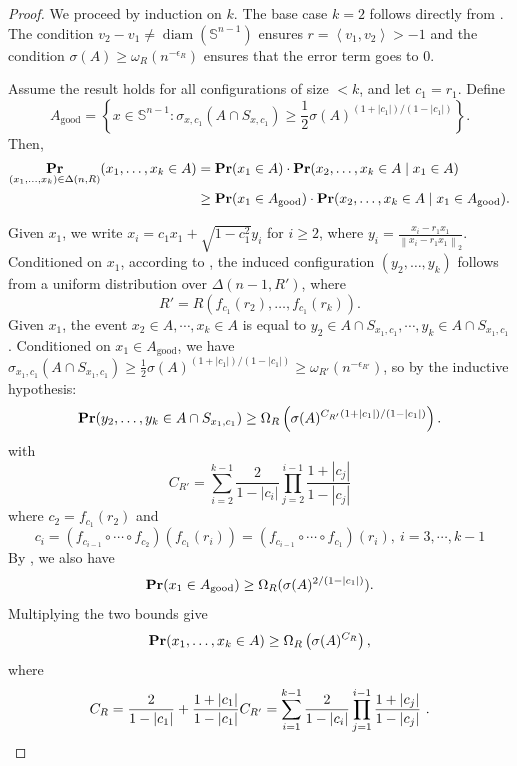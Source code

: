\documentclass[11pt]{article}
\newcommand{\inner}[1]{\left\langle{#1}\right\rangle}
\newcommand{\norm}[1]{\left\lVert#1\right\rVert}
\renewcommand{\Pr}{\mathop{\bf Pr\/}}
\newcommand{\sn}{{\mathbb{S}^{n-1} }}
\begin{document}
\begin{proof}
We proceed by induction on \( k \). The base case \( k = 2 \) follows directly from . The condition \( v_2 - v_1 \neq \operatorname{diam}(\sn) \) ensures \( r = \inner{v_1, v_2} > -1 \) and the condition $\sigma(A)\geq \omega_R(n^{-\epsilon_R})$ ensures that the error term goes to $0$.

Assume the result holds for all configurations of size \( < k \), and let \( c_1 = r_1 \). Define
\[
A_{\mathrm{good}} = \left\{x \in \sn : \sigma_{x, c_1}(A \cap S_{x, c_1}) \geq \frac{1}{2} \sigma(A)^{(1 + |c_1|)/(1 - |c_1|)} \right\}.
\]
Then,
\begin{align*}
\Pr_{(x_1, \dots, x_k) \in \Delta(n, R)}(x_1, \dots, x_k \in A)
&= \Pr(x_1 \in A) \cdot \Pr(x_2, \dots, x_k \in A \mid x_1 \in A) \\
&\geq \Pr(x_1 \in A_{\mathrm{good}}) \cdot \Pr(x_2, \dots, x_k \in A \mid x_1 \in A_{\mathrm{good}}).
\end{align*}

Given \( x_1 \), we write \( x_i = c_1 x_1 + \sqrt{1 - c_1^2} y_i \) for \( i \geq 2 \), where \( y_i =\frac{x_i-r_1x_1}{\norm{x_i-r_1x_1}_2} \). Conditioned on $x_1$, according to , the induced configuration \( (y_2, \dots, y_k) \)  follows from a uniform distribution over \( \Delta(n - 1, R') \), where
\[
R' = R(f_{c_1}(r_2), \dots, f_{c_1}(r_k)).
\]
Given $x_1$, the event $x_2\in A,\cdots,x_k\in A$ is equal to $y_2\in A\cap S_{x_1,c_1},\cdots ,y_k\in A\cap S_{x_1,c_1}$. Conditioned on \( x_1 \in A_{\mathrm{good}} \), we have \( \sigma_{x_1, c_1}(A \cap S_{x_1, c_1}) \geq \frac{1}{2} \sigma(A)^{(1 + |c_1|)/(1 - |c_1|)}\geq \omega_{R'}(n^{-\epsilon_{R'}})\), so by the inductive hypothesis:
\[
\Pr(y_2, \dots, y_k \in A \cap S_{x_1, c_1}) \geq \Omega_R\left(\sigma(A)^{C_{R'} (1 + |c_1|)/(1 - |c_1|)}\right).
\]
with
$$C_{R'}=\sum_{i=2}^{k-1}\frac{2}{1-|c_i|}\prod_{j=2}^{i-1} {\frac{1+|c_j|}{1-|c_j|}}$$
where $c_2=f_{c_1}(r_2)$ and
    $$c_{i}=(f_{c_{i-1}}\circ \cdots \circ f_{c_2})(f_{c_1}(r_i))=(f_{c_{i-1}}\circ \cdots \circ f_{c_1})(r_i),\ i=3,\cdots,k-1$$
By , we also have
\[
\Pr(x_1 \in A_{\mathrm{good}}) \geq \Omega_R(\sigma(A)^{2/(1 - |c_1|)}).
\]
Multiplying the two bounds give
\[
\Pr(x_1, \dots, x_k \in A) \geq \Omega_R\left(\sigma(A)^{C_R}\right),
\]
where
\[
C_R = \frac{2}{1 - |c_1|} + \frac{1 + |c_1|}{1 - |c_1|} C_{R'} = \sum_{i = 1}^{k-1} \frac{2}{1 - |c_i|} \prod_{j = 1}^{i-1} \frac{1 + |c_j|}{1 - |c_j|} \ .\qedhere
\]
\end{proof}
\end{document}
